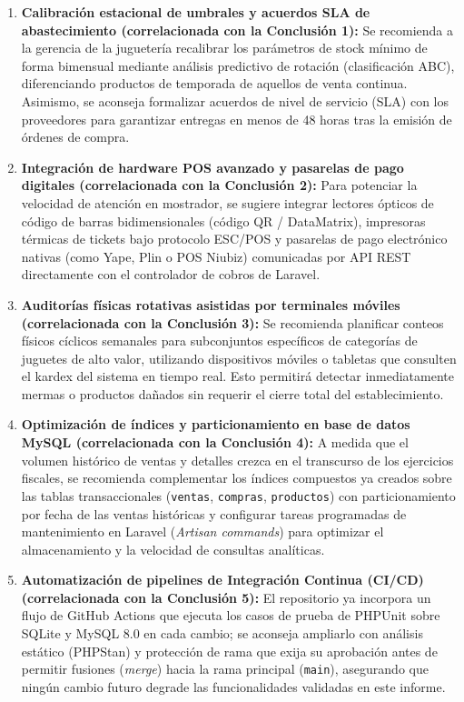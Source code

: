 \documentclass[12pt,a4paper]{article}
\begin{document}
\begin{enumerate}
    \item \textbf{Calibración estacional de umbrales y acuerdos SLA de abastecimiento (correlacionada con la Conclusión 1):} Se recomienda a la gerencia de la juguetería recalibrar los parámetros de stock mínimo de forma bimensual mediante análisis predictivo de rotación (clasificación ABC), diferenciando productos de temporada de aquellos de venta continua. Asimismo, se aconseja formalizar acuerdos de nivel de servicio (SLA) con los proveedores para garantizar entregas en menos de 48 horas tras la emisión de órdenes de compra.
    \item \textbf{Integración de hardware POS avanzado y pasarelas de pago digitales (correlacionada con la Conclusión 2):} Para potenciar la velocidad de atención en mostrador, se sugiere integrar lectores ópticos de código de barras bidimensionales (código QR / DataMatrix), impresoras térmicas de tickets bajo protocolo ESC/POS y pasarelas de pago electrónico nativas (como Yape, Plin o POS Niubiz) comunicadas por API REST directamente con el controlador de cobros de Laravel.
    \item \textbf{Auditorías físicas rotativas asistidas por terminales móviles (correlacionada con la Conclusión 3):} Se recomienda planificar conteos físicos cíclicos semanales para subconjuntos específicos de categorías de juguetes de alto valor, utilizando dispositivos móviles o tabletas que consulten el kardex del sistema en tiempo real. Esto permitirá detectar inmediatamente mermas o productos dañados sin requerir el cierre total del establecimiento.
    \item \textbf{Optimización de índices y particionamiento en base de datos MySQL (correlacionada con la Conclusión 4):} A medida que el volumen histórico de ventas y detalles crezca en el transcurso de los ejercicios fiscales, se recomienda complementar los índices compuestos ya creados sobre las tablas transaccionales (\texttt{ventas}, \texttt{compras}, \texttt{productos}) con particionamiento por fecha de las ventas históricas y configurar tareas programadas de mantenimiento en Laravel (\emph{Artisan commands}) para optimizar el almacenamiento y la velocidad de consultas analíticas.
    \item \textbf{Automatización de pipelines de Integración Continua (CI/CD) (correlacionada con la Conclusión 5):} El repositorio ya incorpora un flujo de GitHub Actions que ejecuta los casos de prueba de PHPUnit sobre SQLite y MySQL 8.0 en cada cambio; se aconseja ampliarlo con análisis estático (PHPStan) y protección de rama que exija su aprobación antes de permitir fusiones (\emph{merge}) hacia la rama principal (\texttt{main}), asegurando que ningún cambio futuro degrade las funcionalidades validadas en este informe.
\end{enumerate}
\end{document}
